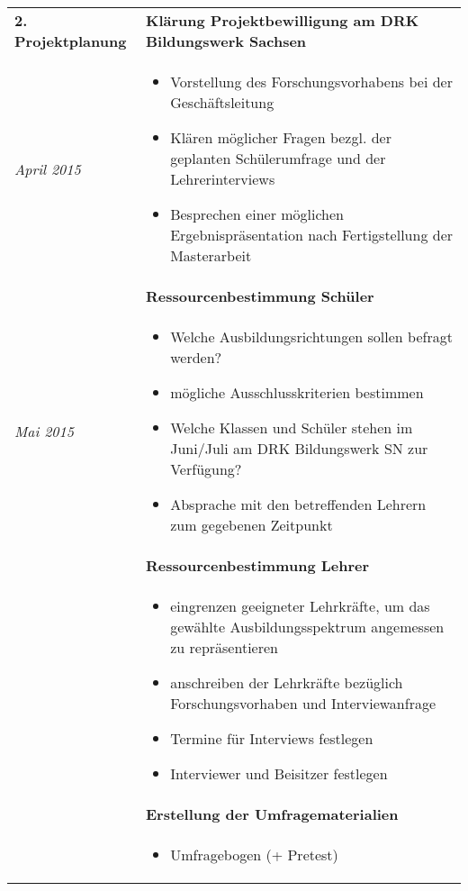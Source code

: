 \begin{longtable}{l|p{9.8cm}}
	\textbf{2. Projektplanung} & \textbf{Klärung Projektbewilligung am DRK Bildungswerk Sachsen} \\
	\emph{April 2015} & 
	\vspace*{-0.6cm}
	\begin{itemize}[nosep,topsep=-0.6cm]
		\item Vorstellung des Forschungsvorhabens bei der Geschäftsleitung
		\item Klären möglicher Fragen bezgl. der geplanten Schülerumfrage und der Lehrerinterviews
		\item Besprechen einer möglichen Ergebnispräsentation nach Fertigstellung der Masterarbeit
	\end{itemize} \\ 
	& \textbf{Ressourcenbestimmung Schüler} \\*
	\emph{Mai 2015} & 
	\vspace*{-0.6cm}
	\begin{itemize}[nosep,topsep=-0.6cm]
		\item Welche Ausbildungsrichtungen sollen befragt werden?
		\item mögliche Ausschlusskriterien bestimmen
		\item Welche Klassen und Schüler stehen im Juni/Juli am DRK Bildungswerk SN zur Verfügung?
		\item Absprache mit den betreffenden Lehrern zum gegebenen Zeitpunkt
	\end{itemize} \\
	& \textbf{Ressourcenbestimmung Lehrer} \\*
	&
	\vspace*{-0.6cm}
	\begin{itemize}[nosep,topsep=-0.6cm]
		\item eingrenzen geeigneter Lehrkräfte, um das gewählte Ausbildungsspektrum angemessen zu repräsentieren
		\item anschreiben der Lehrkräfte bezüglich Forschungsvorhaben und Interviewanfrage
		\item Termine für Interviews festlegen
		\item Interviewer und Beisitzer festlegen
	\end{itemize} \\ 
	& \textbf{Erstellung der Umfragematerialien} \\*
	&
	\vspace*{-0.6cm}
	\begin{itemize}[nosep,topsep=-0.6cm]
		\item Umfragebogen (+ Pretest)

\end{itemize}
\end{longtable}
